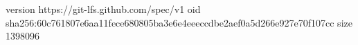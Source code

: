version https://git-lfs.github.com/spec/v1
oid sha256:60c761807e6aa11fece680805ba3e6e4eeeccdbe2aef0a5d266e927e70f107cc
size 1398096
